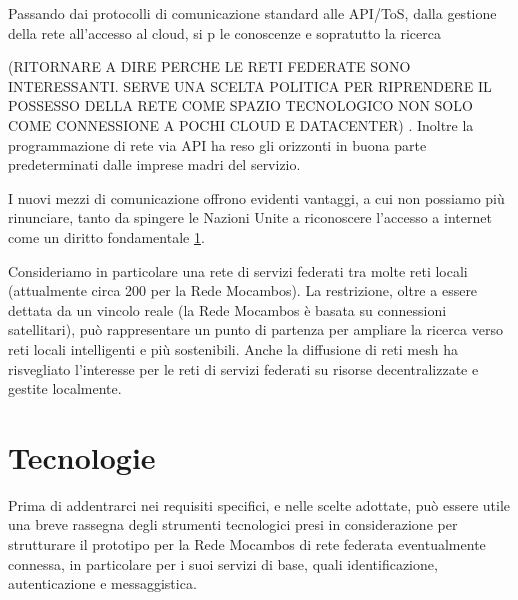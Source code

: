 Passando dai protocolli di comunicazione standard alle API/ToS, dalla
gestione della rete all'accesso al cloud, si p le conoscenze e
sopratutto la ricerca

(RITORNARE A DIRE PERCHE LE RETI FEDERATE SONO INTERESSANTI. SERVE UNA
SCELTA POLITICA PER RIPRENDERE IL POSSESSO DELLA RETE COME SPAZIO
TECNOLOGICO NON SOLO COME CONNESSIONE A POCHI CLOUD E DATACENTER)
. Inoltre la programmazione di rete via API ha reso gli orizzonti in
buona parte predeterminati dalle imprese madri del servizio.

I nuovi mezzi di comunicazione offrono evidenti vantaggi, a cui non
possiamo più rinunciare, tanto da spingere le Nazioni Unite a
riconoscere l'accesso a internet come un diritto fondamentale \ref{}.

Consideriamo in particolare una rete di servizi federati tra molte
reti locali (attualmente circa 200 per la Rede Mocambos). La
restrizione, oltre a essere dettata da un vincolo reale (la Rede
Mocambos è basata su connessioni satellitari), può rappresentare un
punto di partenza per ampliare la ricerca verso reti locali
intelligenti e più sostenibili. Anche la diffusione di reti mesh ha
risvegliato l'interesse per le reti di servizi federati su risorse
decentralizzate e gestite localmente.


\section{Tecnologie}
Prima di addentrarci nei requisiti specifici, e nelle scelte adottate,
può essere utile una breve rassegna degli strumenti tecnologici presi
in considerazione per strutturare il prototipo per la Rede Mocambos di
rete federata eventualmente connessa, in particolare per i suoi
servizi di base, quali identificazione, autenticazione e
messaggistica.

